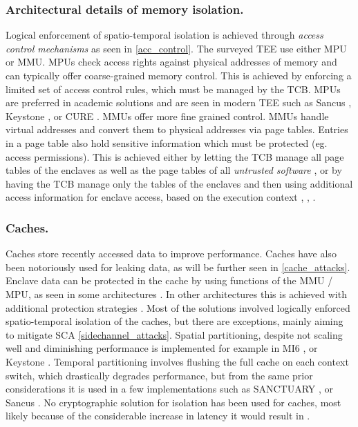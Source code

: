 \documentclass[runningheads,a4paper]{uwsese}
\begin{document}
\subsubsection{Architectural details of memory isolation.}
\label{sect:mem_isolation}

Logical enforcement of spatio-temporal isolation is achieved through
\emph{access control mechanisms} as seen in \ref{acc_control}. The surveyed
\gls{TEE} use either \gls{MPU} or \gls{MMU}. \glspl{MPU} check access rights
against physical addresses of memory and can typically offer coarse-grained
memory control. This is achieved by enforcing a limited set of access control
rules, which must be managed by the \gls{TCB}. \glspl{MPU} are preferred in
academic solutions and are seen in modern \gls{TEE} such as Sancus
\cite{tee_sancus}, Keystone \cite{tee_keystone}, or CURE \cite{tee_cure}.
\glspl{MMU} offer more fine grained control. \glspl{MMU} handle virtual
addresses and convert them to physical addresses via page tables. Entries in a
page table also hold sensitive information which must be protected (eg. access
permissions). This is achieved either by letting the \gls{TCB} manage all page
tables of the enclaves as well as the page tables of all \emph{untrusted
software} \cite{tee_ha-vmsi}, or by having the \gls{TCB} manage only the tables
of the enclaves and then using additional access information for enclave
access, based on the execution context \cite{intel_tdx}, \cite{arm_tz},
\cite{arm_realms} \cite{tee_hw_sup}.

\subsubsection{Caches.}

Caches store recently accessed data to improve performance. Caches have also
been notoriously used for leaking data, as will be further seen in
\ref{cache_attacks}. Enclave data can be protected in the cache by using
functions of the \gls{MMU} / \gls{MPU}, as seen in some architectures
\cite{intel_sgx}. In other architectures this is achieved with additional
protection strategies \cite{arm_tz}. Most of the solutions involved logically
enforced spatio-temporal isolation of the caches, but there are exceptions,
mainly aiming to mitigate \gls{SCA} \ref{sidechannel_attacks}. Spatial
partitioning, despite not scaling well and diminishing performance is
implemented for example in MI6 \cite{tee_mi6}, or Keystone \cite{tee_keystone}.
Temporal partitioning involves flushing the full cache on each context switch,
which drastically degrades performance, but from the same prior considerations
it is used in a few implementations such as SANCTUARY \cite{tee_sanctuary}, or
Sancus \cite{tee_sancus}. No cryptographic solution for isolation has been used
for caches, most likely because of the considerable increase in latency it
would result in \cite{tee_hw_sup}.
\end{document}
